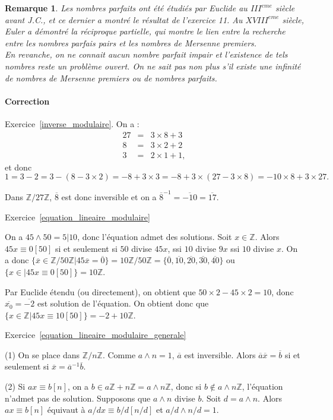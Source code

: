 \documentclass[11pt,a4paper]{article}
\newtheorem*{rem}{Remarque}
\newcommand{\Z}{\mathbb{Z}}
\begin{document}
\begin{rem}
Les nombres parfaits ont été étudiés par Euclide au $III^{eme}$ siècle avant J.C., et ce dernier a montré le résultat de l'exercice 11. Au $XVIII^{eme}$ siècle, Euler a démontré la réciproque partielle, qui montre le lien entre la recherche entre les nombres parfais pairs et les nombres de Mersenne premiers. \\
En revanche, on ne connait aucun nombre parfait impair et l'existence de tels nombres reste un problème ouvert. On ne sait pas non plus s'il existe une infinité de nombres de Mersenne premiers ou de nombres parfaits. 
\end{rem}


\paragraph{Correction}

Exercice~\ref{inverse_modulaire}. On a  :\[\begin{aligned} 27&=&3\times 8+3\\ 8&=&3\times 2+2\\ 3&=&2\times 1+1,\end{aligned}\] et donc \[1=3-2=3-(8-3\times 2)=-8+3\times 3=-8+3\times (27-3\times 8)=-10\times 8+3\times 27.\]

Dans $\Z/27\Z$, $\overline{8}$ est donc inversible et on a  $\overline{8}^{-1}=\overline{-10}=\overline{17}$.

Exercice~\ref{equation_lineaire_modulaire}

On a $45\wedge 50=5|10$, donc l'équation admet des solutions. Soit $x\in \Z$. Alors $45x\equiv 0[50]$ si et seulement si $50$ divise $45 x$, ssi $10$ divise $9x$ ssi $10$ divise $x$. On a donc $\{\overline{x}\in \Z/50\Z|45 \overline{x}=\overline{0}\}=10 \Z/50\Z=\{\overline{0},\overline{10}, \overline{20}, \overline{30}, \overline{40}\}$ ou $\{x\in |45x\equiv 0[50]\}=10\Z$. 

Par Euclide étendu (ou directement), on obtient que $50\times 2-45\times 2 =10$, donc $\overline{x_0}=\overline{-2}$ est solution de l'équation. On obtient donc que $\{x\in \Z|45x\equiv 10[50]\}=-2+10\Z$. 


Exercice~\ref{equation_lineaire_modulaire_generale}


(1) On se place dans $\Z/n\Z$. Comme $a\wedge n=1$, $\overline{a}$ est inversible. Alors $\overline{a}\overline{x}=\overline{b}$ si et seulement si $\overline{x}=\overline{a}^{-1}\overline{b}$. 

(2) Si $ax\equiv b[n]$, on a $b\in a\Z+n\Z=a\wedge n \Z$, donc si $b\notin a\wedge n \Z$, l'équation n'admet pas de solution. Supposons que $a\wedge n $ divise $b$. Soit $d=a\wedge n$. Alors $ax\equiv b[n]$ équivaut à $a/d x\equiv b/d[n/d]$ et $a/d\wedge n/d=1$.
\end{document}
